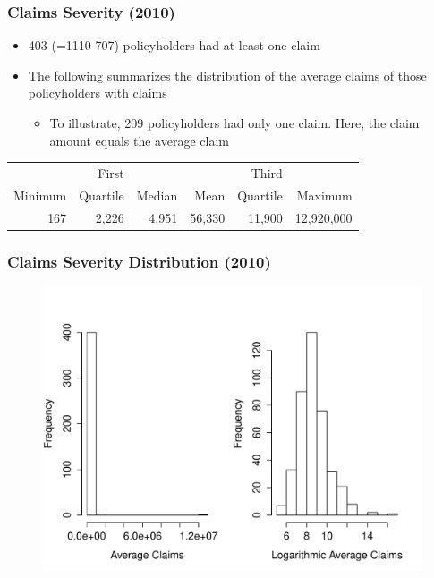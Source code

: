 \documentclass[serif,10pt]{beamer}
\begin{document}
\begin{frame}
\frametitle{Claims Severity (2010)}
  \begin{itemize}
\item 403 (=1110-707) policyholders had at least one claim \vspace{2mm}
\item The following summarizes the distribution of the average claims of those policyholders with
claims \vspace{2mm}
\begin{itemize}\item To illustrate, 209 policyholders had only one claim. Here, the claim amount equals the average
claim \vspace{2mm}
\end{itemize}\end{itemize}
\vspace{-.1in}
\begin{table}[htbp]
  \centering
    \begin{tabular}{rrrrrr}
    \hline
        &First &        &         &Third &\\
Minimum& Quartile    &Median &Mean     & Quartile     &Maximum \\  \hline
167    & 2,226        &4,951 & 56,330  &  11,900      & 12,920,000 \\
    \hline
    \end{tabular}
 \end{table}
\end{frame}

\begin{frame}
\frametitle{Claims Severity Distribution (2010)}
\begin{figure}[htp]
\begin{center}
    \includegraphics[scale = 0.4, bb = 400 220 100 100]{Figures/Severity1.pdf}
\end{center}
\end{figure}
\end{frame}
\end{document}
